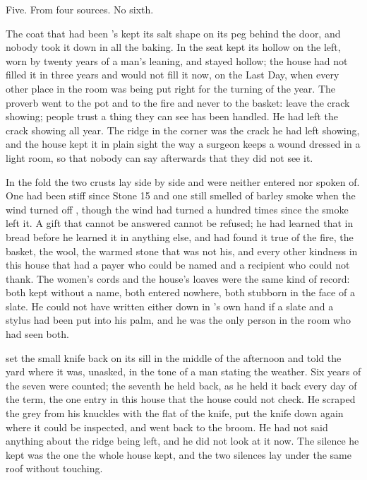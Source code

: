 Five. From four sources. No sixth.

\scenebreak

The coat that had been 's kept its salt shape on its peg behind the door, and nobody took it down in all the baking. In  the seat kept its hollow on the left, worn by twenty years of a man's leaning, and stayed hollow; the house had not filled it in three years and would not fill it now, on the Last Day, when every other place in the room was being put right for the turning of the year. The proverb went to the pot and to the fire and never to the basket: leave the crack showing; people trust a thing they can see has been handled. He had left the crack showing all year. The ridge in the corner was the crack he had left showing, and the house kept it in plain sight the way a surgeon keeps a wound dressed in a light room, so that nobody can say afterwards that they did not see it.

In the fold the two crusts lay side by side and were neither entered nor spoken of. One had been stiff since Stone 15 and one still smelled of barley smoke when the wind turned off , though the wind had turned a hundred times since the smoke left it. A gift that cannot be answered cannot be refused; he had learned that in bread before he learned it in anything else, and had found it true of the fire, the basket, the wool, the warmed stone that was not his, and every other kindness in this house that had a payer who could be named and a recipient who could not thank. The women's cords and the house's loaves were the same kind of record: both kept without a name, both entered nowhere, both stubborn in the face of a slate. He could not have written either down in 's own hand if a slate and a stylus had been put into his palm, and he was the only person in the room who had seen both.

 set the small knife back on its sill in the middle of the afternoon and told the yard where it was, unasked, in the tone of a man stating the weather. Six years of the seven were counted; the seventh he held back, as he held it back every day of the term, the one entry in this house that the house could not check. He scraped the grey from his knuckles with the flat of the knife, put the knife down again where it could be inspected, and went back to the broom. He had not said anything about the ridge being left, and he did not look at it now. The silence he kept was the one the whole house kept, and the two silences lay under the same roof without touching.

